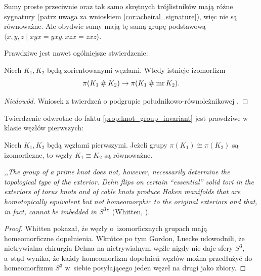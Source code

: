 Sumy proste przeciwnie oraz tak samo skrętnych trójlistników mają różne sygnatury (patrz uwaga za wnioskiem \ref{cor:acheiral_signature}), więc nie są równoważne.
Ale obydwie sumy mają tę samą grupę podstawową $\langle x,y,z \mid xyx=yxy,xzx=zxz\rangle$.

Prawdziwe jest nawet ogólniejsze stwierdzenie:

\begin{proposition}
    Niech $K_1, K_2$ będą zorientowanymi węzłami.
    Wtedy istnieje izomorfizm
    \begin{equation}
        \pi(K_1 \mathbin{\#} K_2) \to \pi(K_1 \mathbin{\#} \operatorname{mr} K_2).
    \end{equation}
\end{proposition}

\begin{proof}[Niedowód]
    Wniosek z twierdzeń o podgrupie południkowo-równoleżnikowej \cite[s. 75]{kawauchi1996}.
\end{proof}

Twierdzenie odwrotne do faktu \ref{prop:knot_group_invariant} jest prawdziwe w klasie węzłów pierwszych:

\begin{proposition}
    Niech $K_1, K_2$ będą węzłami pierwszymi.
    Jeżeli grupy $\pi(K_1) \cong \pi(K_2)$ są izomorficzne, to węzły $K_1 \equiv K_2$ są równoważne.
\end{proposition}

,,\emph{The group of a prime knot does not, however, necessarily determine the topological type of the exterior. Dehn flips on certain “essential” solid tori in the exteriors of torus knots and of cable knots produce Haken manifolds that are homotopically equivalent but not homeomorphic to the original exteriors and that, in fact, cannot be imbedded in $S^3$}'' (Whitten, \cite{whitten1987}).
%

\begin{proof}
%
%
%
    Whitten \cite{whitten1987} pokazał, że węzły o~izomorficznych grupach mają homeomorficzne dopełnienia.
    Wkrótce po tym Gordon, Luecke \cite{gordon1989} udowodnili, że nietrywialna chirurgia Dehna na nietrywialnym węźle nigdy nie daje sfery $S^3$, a~stąd wynika, że każdy homeomorfizm dopełnień węzłów można przedłużyć do homeomorfizmu $S^3$ w~siebie posyłającego jeden węzeł na drugi jako zbiory.
%
\end{proof}


